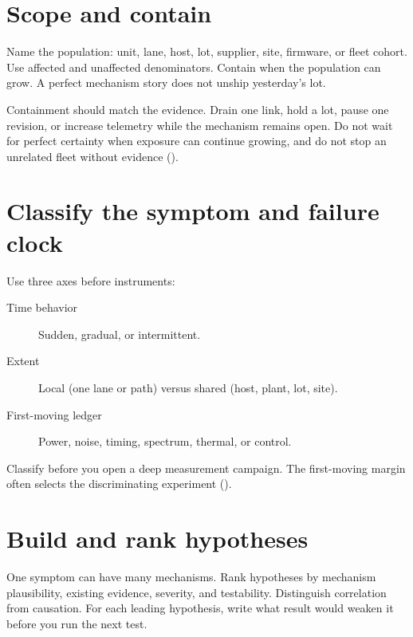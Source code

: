 
\section{Scope and contain}
\label{sec:fa-scope}

Name the population: unit, lane, host, lot, supplier, site, firmware, or fleet
cohort. Use affected and unaffected denominators. Contain when the population
can grow. A perfect mechanism story does not unship yesterday's lot.

Containment should match the evidence. Drain one link, hold a lot, pause one
revision, or increase telemetry while the mechanism remains open. Do not wait
for perfect certainty when exposure can continue growing, and do not stop an
unrelated fleet without evidence ().

\section{Classify the symptom and failure clock}
\label{sec:fa-classify}

Use three axes before instruments:

\begin{description}
\item[Time behavior] Sudden, gradual, or intermittent.
\item[Extent] Local (one lane or path) versus shared (host, plant, lot, site).
\item[First-moving ledger] Power, noise, timing, spectrum, thermal, or control.
\end{description}

Classify before you open a deep measurement campaign. The first-moving margin
often selects the discriminating experiment
().

\section{Build and rank hypotheses}
\label{sec:fa-hypotheses}

One symptom can have many mechanisms. Rank hypotheses by mechanism plausibility,
existing evidence, severity, and testability. Distinguish correlation from
causation. For each leading hypothesis, write what result would weaken it before
you run the next test.

